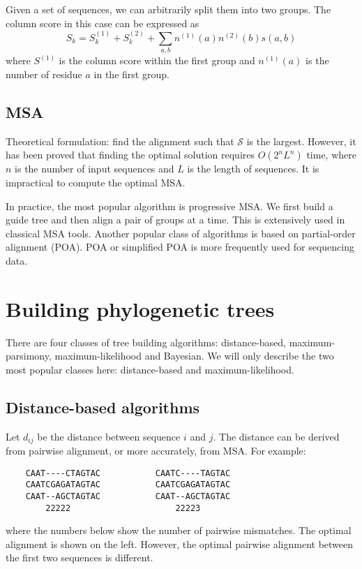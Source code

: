 \documentclass[10pt]{article}
\begin{document}
Given a set of sequences, we can arbitrarily split them into two groups. The
column score in this case can be expressed as
$$
S_k=S^{(1)}_k+S^{(2)}_k+\sum_{a,b}n^{(1)}(a)n^{(2)}(b)s(a,b)
$$
where $S^{(1)}$ is the column score within the first group and $n^{(1)}(a)$ is
the number of residue $a$ in the first group.

\subsection{MSA}

Theoretical formulation: find the alignment such that $\mathcal{S}$ is the
largest. However, it has been proved that finding the optimal solution requires
$O(2^nL^n)$ time, where $n$ is the number of input sequences and $L$ is the
length of sequences. It is impractical to compute the optimal MSA.

In practice, the most popular algorithm is progressive MSA. We first build a
guide tree and then align a pair of groups at a time. This is extensively used
in classical MSA tools. Another popular class of algorithms is based on
partial-order alignment (POA). POA or simplified POA is more frequently used
for sequencing data.

\newpage

\section{Building phylogenetic trees}

There are four classes of tree building algorithms: distance-based,
maximum-parsimony, maximum-likelihood and Bayesian. We will only describe the
two most popular classes here: distance-based and maximum-likelihood.

\subsection{Distance-based algorithms}

Let $d_{ij}$ be the distance between sequence $i$ and $j$. The distance can be
derived from pairwise alignment, or more accurately, from MSA. For example:
\begin{verbatim}
    CAAT----CTAGTAC           CAATC----TAGTAC
    CAATCGAGATAGTAC           CAATCGAGATAGTAC
    CAAT--AGCTAGTAC           CAAT--AGCTAGTAC
        22222                     22223
\end{verbatim}
where the numbers below show the number of pairwise mismatches. The optimal
alignment is shown on the left. However, the optimal pairwise alignment between
the first two sequences is different.
\end{document}
